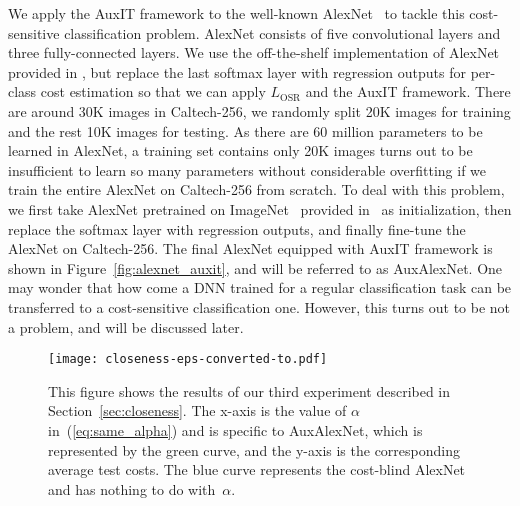 \documentclass[a4paper]{article}
\begin{document}
  We apply the AuxIT framework to the well-known AlexNet~\cite{krizhevsky2012imagenet} to tackle this cost-sensitive classification problem.
  AlexNet consists of five convolutional layers and three fully-connected layers.
  We use the off-the-shelf implementation of AlexNet provided in \cite{ding2014theano}, but replace the last softmax layer with regression outputs for per-class cost estimation so that we can apply $L_{\mathrm{OSR}}$ and the AuxIT framework.
  There are around 30K images in Caltech-256, we randomly split 20K images for training and the rest 10K images for testing.
  As there are 60 million parameters to be learned in AlexNet, a training set contains only 20K images turns out to be insufficient to learn so many parameters without considerable overfitting if we train the entire AlexNet on Caltech-256 from scratch.
  To deal with this problem, we first take AlexNet pretrained on ImageNet~\cite{ILSVRC15} provided in~\cite{ding2014theano} as initialization, then replace the softmax layer with regression outputs, and finally fine-tune the AlexNet on Caltech-256.
  The final AlexNet equipped with AuxIT framework is shown in Figure~\ref{fig:alexnet_auxit}, and will be referred to as AuxAlexNet.
  One may wonder that how come a DNN trained for a regular classification task can be transferred to a cost-sensitive classification one.
  However, this turns out to be not a problem, and will be discussed later.

  \begin{figure}[h]
    \centering
    \texttt{[image: closeness-eps-converted-to.pdf]}
    \caption{
      This figure shows the results of our third experiment described in Section~\ref{sec:closeness}.
      The x-axis is the value of $\alpha$ in~(\ref{eq:same_alpha}) and is specific to AuxAlexNet, which is represented by the green curve, and the y-axis is the corresponding average test costs.
      The blue curve represents the cost-blind AlexNet and has nothing to do with~$\alpha$.
    }
    \label{fig:closeness_results}
  \end{figure}
\end{document}
